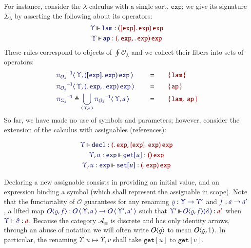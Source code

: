 \documentclass[11pt]{article}
\theoremstyle{definition}
\theoremstyle{remark}
\numberwithin{equation}{section}
\def\IModeColorName{MidnightBlue}
\def\OModeColorName{Maroon}
\newcommand\IMode[1]{{\color{\IModeColorName}{#1}}}
\newcommand\OMode[1]{{\color{\OModeColorName}{#1}}}
\newcommand\MkSet[1]{\left\{\,#1\,\right\}}
\newcommand\Of[2]{\IMode{#1}: \IMode{#2}}
\newcommand\MkValence[3]{%
  \ifthenelse{\equal{#1}{}}{}{%
    \{#1\}%
  }%
  \ifthenelse{\equal{#2}{}}{}{%
    [#2]%
  }.\, #3%
}
\newcommand\MkArity[2]{(#1)\, #2}
\newcommand\ArrId[1]{1_{#1}}
\newcommand\Arities{\mathcal{A}}
\newcommand\Operators{\mathcal{O}}
\newcommand\Discrete[1]{#1_{\equiv}}
\newcommand\IsOperator[3]{
  \IMode{#1}\,{\Vdash}\,\IMode{#2}: \OMode{#3}
}
\newcommand\Grothendieck[2]{\oint^{#1} #2#1}
\newcommand\Pair[2]{\left\langle\,#1,#2\,\right\rangle}
\newcommand\FLift[2]{
  \Operators\langle#1%
  \ifthenelse{\equal{#2}{}}{}{, #2}\rangle%
}
\newcommand\SortExp{\mathtt{exp}}
\begin{document}
For instance, consider the $\lambda$-calculus with a single sort, $\SortExp$; we
give its signature $\Sigma_{\lambda}$ by asserting the following about its
operators:
\begin{gather*}
  \IsOperator{\Upsilon}{\mathtt{lam}}{
    \MkArity{\MkValence{}{\SortExp}{\SortExp}}{\SortExp}
  }\\
  \IsOperator{\Upsilon}{\mathtt{ap}}{
    \MkArity{
      \MkValence{}{}{\SortExp},
      \MkValence{}{}{\SortExp}
    }{\SortExp}
  }
\end{gather*}
These rules correspond to objects of $\Grothendieck{}{{\Operators}_{\lambda}}$ and we
collect their fibers into sets of operators:
\begin{alignat*}{5}
\IMode{{\pi_{{\Operators}_{\lambda}}}^{-1}}&\IMode{\Pair{\Upsilon}{{\MkArity{\MkValence{}{\SortExp}{\SortExp}}{\SortExp}}}}\quad&&=
  &&\quad\OMode{\MkSet{\mathtt{lam}}}\\
\IMode{{\pi_{{\Operators}_{\lambda}}}^{-1}}&\IMode{\Pair{\Upsilon}{\MkArity{\MkValence{}{}{\SortExp},\MkValence{}{}{\SortExp}}{\SortExp}}}\quad&&=
  &&\quad\OMode{\MkSet{\mathtt{ap}}}\\
\IMode{{\pi_{{\Sigma}_{\lambda}}}^{-1}}&\triangleq\IMode{\bigcup_{\Pair{\Upsilon}{a}}{{\pi_{{\Operators}_{\lambda}}}^{-1}{\Pair{\Upsilon}{a}}}}\quad&&=
  &&\quad\OMode{\MkSet{\mathtt{lam},\ \mathtt{ap}}}\\
\end{alignat*}
So far, we have made no use of symbols and parameters; however, consider the
extension of the calculus with assignables (references):

\begin{gather*}
  \IsOperator{\Upsilon}{\mathtt{decl}}{
    \MkArity{
      \MkValence{}{}{\SortExp},
      \MkValence{\SortExp}{}{\SortExp}
    }{
      \SortExp
    }
  }\\
  \IsOperator{\Upsilon,u:\SortExp}{\mathtt{get}[u]}{
    \MkArity{}{\SortExp}
  }\\
  \IsOperator{\Upsilon,u:\SortExp}{\mathtt{set}[u]}{
    \MkArity{
      \MkValence{}{}{\SortExp}
    }{
      \SortExp
    }
  }
\end{gather*}

Declaring a new assignable consists in providing an initial value, and an
expression binding a symbol (which shall represent the assignable in scope).
Note that the functoriality of $\Operators$ guarantees for any renaming
$\Of{\varrho}{\Upsilon\to\Upsilon'}$ and $\Of{f}{a\to a'}$, a lifted map
$\Of{\FLift{\varrho}{f}}{\Operators\Pair{\Upsilon}{a}\to\Operators\Pair{\Upsilon'}{a'}}$
such that $\IsOperator{\Upsilon'}{\FLift{\varrho}{f}(\vartheta)}{a'}$ when
$\IsOperator{\Upsilon}{\vartheta}{a}$. Because the category
$\Discrete{\Arities}$ is discrete and has only identity arrows, through an abuse
of notation we will often write $\FLift{\varrho}{}$ to mean
$\FLift{\varrho}{\ArrId{}}$. In particular, the renaming
$\Upsilon,u\mapsto\Upsilon,v$ shall take $\mathtt{get}[u]$ to $\mathtt{get}[v]$.
\end{document}
